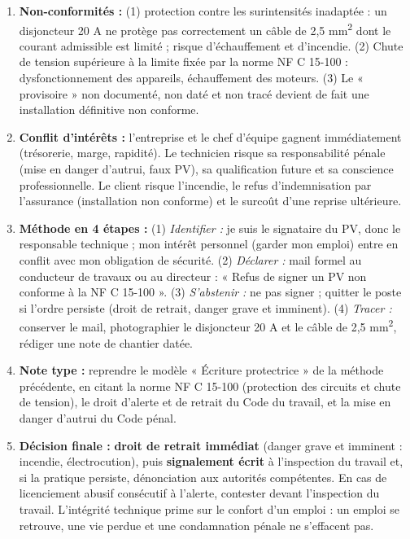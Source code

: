 \documentclass[11pt]{article}
\begin{document}
\begin{corrige}
\begin{enumerate}
    \item \textbf{Non-conformités :} (1) protection contre les surintensités inadaptée : un disjoncteur 20 A ne protège pas correctement un câble de 2,5 mm\textsuperscript{2} dont le courant admissible est limité ; risque d'échauffement et d'incendie. (2) Chute de tension supérieure à la limite fixée par la norme NF C 15-100 : dysfonctionnement des appareils, échauffement des moteurs. (3) Le « provisoire » non documenté, non daté et non tracé devient de fait une installation définitive non conforme.
    \item \textbf{Conflit d'intérêts :} l'entreprise et le chef d'équipe gagnent immédiatement (trésorerie, marge, rapidité). Le technicien risque sa responsabilité pénale (mise en danger d'autrui, faux PV), sa qualification future et sa conscience professionnelle. Le client risque l'incendie, le refus d'indemnisation par l'assurance (installation non conforme) et le surcoût d'une reprise ultérieure.
    \item \textbf{Méthode en 4 étapes :} (1) \emph{Identifier :} je suis le signataire du PV, donc le responsable technique ; mon intérêt personnel (garder mon emploi) entre en conflit avec mon obligation de sécurité. (2) \emph{Déclarer :} mail formel au conducteur de travaux ou au directeur : « Refus de signer un PV non conforme à la NF C 15-100 ». (3) \emph{S'abstenir :} ne pas signer ; quitter le poste si l'ordre persiste (droit de retrait, danger grave et imminent). (4) \emph{Tracer :} conserver le mail, photographier le disjoncteur 20 A et le câble de 2,5 mm\textsuperscript{2}, rédiger une note de chantier datée.
    \item \textbf{Note type :} reprendre le modèle « Écriture protectrice » de la méthode précédente, en citant la norme NF C 15-100 (protection des circuits et chute de tension), le droit d'alerte et de retrait du Code du travail, et la mise en danger d'autrui du Code pénal.
    \item \textbf{Décision finale :} \textbf{droit de retrait immédiat} (danger grave et imminent : incendie, électrocution), puis \textbf{signalement écrit} à l'inspection du travail et, si la pratique persiste, dénonciation aux autorités compétentes. En cas de licenciement abusif consécutif à l'alerte, contester devant l'inspection du travail. L'intégrité technique prime sur le confort d'un emploi : un emploi se retrouve, une vie perdue et une condamnation pénale ne s'effacent pas.
\end{enumerate}
\end{corrige}
\end{document}
